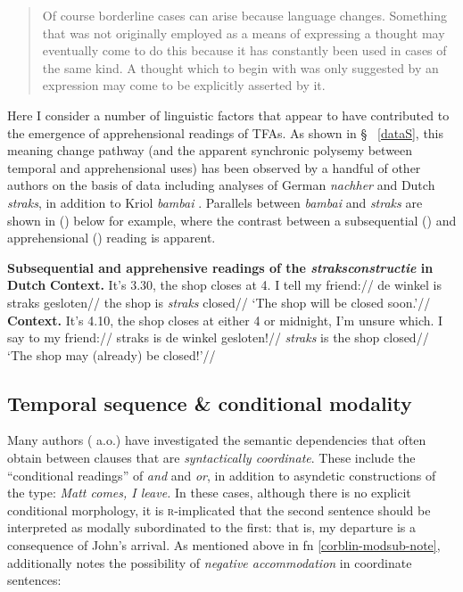 \begin{quote}\small
	Of course borderline cases can arise because language changes. Something	that was not originally employed as a means of expressing a thought may eventually come to do this because it has constantly been used in cases of the same kind. A thought which to begin with was only suggested by an expression may come to be explicitly asserted by it.
\end{quote}


\noindent Here I consider a number of linguistic factors that appear to have contributed to the emergence of apprehensional readings of TFAs. As shown in \S~	\ref{dataS}, this meaning change pathway (and the apparent synchronic polysemy between temporal and apprehensional uses) has been observed by a handful of other authors \citep{Angelo2016,Angelo2018,Boogaart2020} on the basis of data including analyses of German \textit{nachher} and Dutch \textit{straks}, in addition to Kriol \textit{bambai} \citep[see also ][427-8]{Kuteva2019}. Parallels between \textit{bambai} and \textit{straks} are shown in () below for example, where the contrast between a subsequential () and apprehensional () reading is apparent.

\pex \textbf{Subsequential and apprehensive readings of the \textit{straksconstructie} in Dutch} %
\a\begingl\glpreamble\textbf{Context.} It's 3.30, the shop closes at 4. I tell my friend://
\gla de winkel is straks gesloten//
\glb the shop is \textit{straks} closed//
\glft `The shop will be closed soon.'//\endgl
\a\begingl\glpreamble\textbf{Context.} It's 4.10, the shop closes at either 4 or midnight, I'm unsure which. I say to my friend://
\gla straks is de winkel gesloten!//
\glb \textit{straks} is the shop closed//
\glft`The shop may (already) be closed!'//\endgl\xe


\subsection{Temporal sequence \& conditional modality}
Many authors (\citealp[\textit{e.g.},][]{Stukker2012,Schmerling1975,Harder1995,Culicover1997,Klinedinst2012,Bluhdorn2008} a.o.) have investigated the semantic dependencies that often obtain between clauses that are \textit{syntactically coordinate}. These include the ``conditional readings'' of \textit{and} and \textit{or}, in addition to asyndetic constructions of the type: \textit{Matt comes, I leave.} In these cases, although there is no explicit conditional morphology, it is \textsc{r}-implicated that the second sentence should be interpreted as modally subordinated to the first: that is, my departure is a consequence of John's arrival. As mentioned above in fn \ref{corblin-modsub-note}, \citet[256-258]{Corblin2002} additionally notes the possibility of \textit{negative accommodation} in coordinate sentences:

